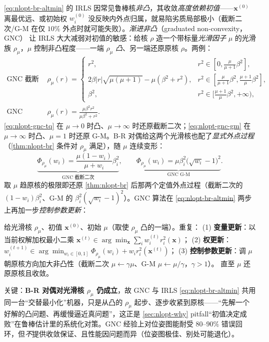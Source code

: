 \cref{eq:nlopt-br-altmin} 的 IRLS 因常见鲁棒核\emph{非凸}，其收敛\emph{高度依赖初值}——$\mathbf{x}^{(0)}$ 离最优远、或初始权 $w_i^{(0)}$ 没反映内外点归属，就易陷劣质局部极小（截断二次/G-M 在仅 $10\%$ 外点时就可能失败\cite{carlone2026handbook}）。\emph{渐进非凸}（graduated non-convexity，GNC）\cite{yang2020gnc} 让 IRLS 大大减弱对初值的敏感：给核 $\rho$ 造一个带标量\emph{光滑因子} $\mu$ 的光滑族 $\rho_\mu$，$\mu$ 控制非凸程度——一端 $\rho_\mu$ \emph{凸}、另一端还原原核 $\rho$。两例：
\begin{align}
  \text{GNC 截断二次：}\ &\rho_\mu(r)=
  \begin{cases}
  r^2,& r^2\in[0,\tfrac{\mu}{\mu+1}\beta^2],\\
  2\beta|r|\sqrt{\mu(\mu+1)}-\mu(\beta^2+r^2),& r^2\in[\tfrac{\mu}{\mu+1}\beta^2,\tfrac{\mu+1}{\mu}\beta^2],\\
  \beta^2,& r^2\in[\tfrac{\mu+1}{\mu}\beta^2,+\infty),
  \end{cases}
  \label{eq:nlopt-gnc-tq}\\
  \text{GNC Geman--McClure：}\ &\rho_\mu(r)=\frac{\mu\beta^2 r^2}{\mu\beta^2+r^2}.
  \label{eq:nlopt-gnc-gm}
\end{align}
\cref{eq:nlopt-gnc-tq} 在 $\mu\to0$ 时凸、$\mu\to\infty$ 时还原截断二次；\cref{eq:nlopt-gnc-gm} 在 $\mu\to\infty$ 时凸、$\mu{=}1$ 时还原 G-M。B-R 对偶给这两个光滑核也配了\emph{显式外点过程}（\cref{thm:nlopt-br} 条件对 $\rho_\mu$ 满足），随 $\mu$ 连续变形：
\begin{equation}
  \underbrace{\Phi_{\rho_\mu}(w_i)=\frac{\mu(1-w_i)}{\mu+w_i}\beta_i^2}_{\text{GNC 截断二次}},\qquad
  \underbrace{\Phi_{\rho_\mu}(w_i)=\mu\beta_i^2\big(\sqrt{w_i}-1\big)^2}_{\text{GNC G-M}}.
  \label{eq:nlopt-gnc-outlier}
\end{equation}
取 $\mu$ 趋原核的极限即还原 \cref{thm:nlopt-br} 后那两个定值外点过程（截断二次的 $(1-w_i)\beta_i^2$、G-M 的 $\beta_i^2(\sqrt{w_i}-1)^2$）。GNC 算法在 \cref{eq:nlopt-br-altmin} 两步上再加一步\emph{控制参数更新}：
\begin{algo}\label{alg:nlopt-gnc}
给光滑核 $\rho_\mu$、初值 $\mathbf{x}^{(0)}$、初始 $\mu$（取使 $\rho_\mu$ 凸的一端）。重复：
(1) \textbf{变量更新}：以当前权解加权最小二乘 $\mathbf{x}^{(t)}\in\arg\min_{\mathbf{x}}\sum_i w_i^{(t)}r_i^2(\mathbf{x})$；
(2) \textbf{权更新}：$w_i^{(t+1)}\in\arg\min_{w_i\in[0,1]}\Phi_{\rho_\mu}(w_i)+w_i r_i^2(\mathbf{x}^{(t)})$；
(3) \textbf{控制参数更新}：调 $\mu$ 朝原核方向加大非凸性（截断二次 $\mu\leftarrow\gamma\mu$、G-M $\mu\leftarrow\mu/\gamma$，$\gamma>1$）。
直至 $\mu$ 还原原核且收敛。
\end{algo}
\noindent 关键：\textbf{B-R 对偶对光滑核 $\rho_\mu$ 仍成立}，故 GNC 与 IRLS \cref{eq:nlopt-br-altmin} 共用同一台“交替最小化”机器，只是从凸的 $\rho_\mu$ 起步、逐步收紧到原核——“先解一个好解的凸问题、再缓慢逼近真问题”，这正是 \cref{sec:nlopt-why} pitfall“初值决定成败”在鲁棒估计里的系统化对策。GNC 经验上对位姿图能耐受 $80\text{--}90\%$ 错误回环，但\emph{不}提供收敛保证、且性能因问题而异（位姿图极佳、别处可能退化）。

